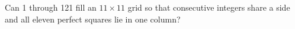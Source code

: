 Can 1 through 121 fill an $11\times11$ grid so that consecutive integers share a side and all eleven perfect squares lie in one column?
